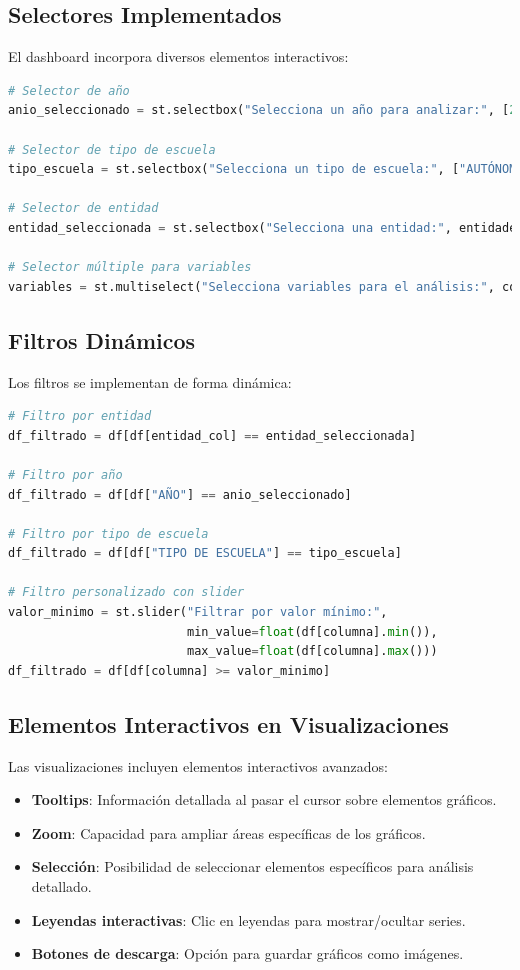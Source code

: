 \subsection{Selectores Implementados}
El dashboard incorpora diversos elementos interactivos:

\begin{lstlisting}[language=Python, caption=Implementación de selectores]
# Selector de año
anio_seleccionado = st.selectbox("Selecciona un año para analizar:", [2015, 2016, 2017])

# Selector de tipo de escuela
tipo_escuela = st.selectbox("Selecciona un tipo de escuela:", ["AUTÓNOMAS", "ESTATAL", "FEDERAL", "PARTICULARES"])

# Selector de entidad
entidad_seleccionada = st.selectbox("Selecciona una entidad:", entidades)

# Selector múltiple para variables
variables = st.multiselect("Selecciona variables para el análisis:", columnas_numericas)
\end{lstlisting}

\subsection{Filtros Dinámicos}
Los filtros se implementan de forma dinámica:

\begin{lstlisting}[language=Python, caption=Implementación de filtros dinámicos]
# Filtro por entidad
df_filtrado = df[df[entidad_col] == entidad_seleccionada]

# Filtro por año
df_filtrado = df[df["AÑO"] == anio_seleccionado]

# Filtro por tipo de escuela
df_filtrado = df[df["TIPO DE ESCUELA"] == tipo_escuela]

# Filtro personalizado con slider
valor_minimo = st.slider("Filtrar por valor mínimo:", 
                         min_value=float(df[columna].min()), 
                         max_value=float(df[columna].max()))
df_filtrado = df[df[columna] >= valor_minimo]
\end{lstlisting}

\subsection{Elementos Interactivos en Visualizaciones}
Las visualizaciones incluyen elementos interactivos avanzados:

\begin{itemize}
    \item \textbf{Tooltips}: Información detallada al pasar el cursor sobre elementos gráficos.
    \item \textbf{Zoom}: Capacidad para ampliar áreas específicas de los gráficos.
    \item \textbf{Selección}: Posibilidad de seleccionar elementos específicos para análisis detallado.
    \item \textbf{Leyendas interactivas}: Clic en leyendas para mostrar/ocultar series.
    \item \textbf{Botones de descarga}: Opción para guardar gráficos como imágenes.
\end{itemize}


